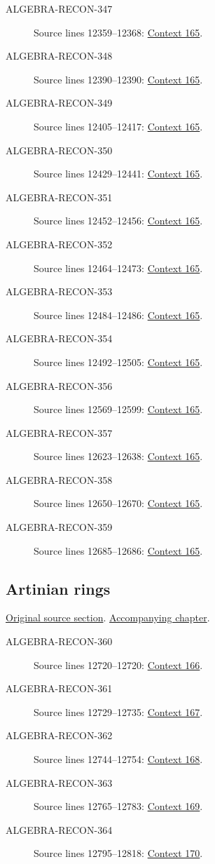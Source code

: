 \begin{description}
\item[ALGEBRA-RECON-347] Source lines 12359--12368: \hyperlink{algebra-context-165}{Context 165}.
\item[ALGEBRA-RECON-348] Source lines 12390--12390: \hyperlink{algebra-context-165}{Context 165}.
\item[ALGEBRA-RECON-349] Source lines 12405--12417: \hyperlink{algebra-context-165}{Context 165}.
\item[ALGEBRA-RECON-350] Source lines 12429--12441: \hyperlink{algebra-context-165}{Context 165}.
\item[ALGEBRA-RECON-351] Source lines 12452--12456: \hyperlink{algebra-context-165}{Context 165}.
\item[ALGEBRA-RECON-352] Source lines 12464--12473: \hyperlink{algebra-context-165}{Context 165}.
\item[ALGEBRA-RECON-353] Source lines 12484--12486: \hyperlink{algebra-context-165}{Context 165}.
\item[ALGEBRA-RECON-354] Source lines 12492--12505: \hyperlink{algebra-context-165}{Context 165}.
\item[ALGEBRA-RECON-356] Source lines 12569--12599: \hyperlink{algebra-context-165}{Context 165}.
\item[ALGEBRA-RECON-357] Source lines 12623--12638: \hyperlink{algebra-context-165}{Context 165}.
\item[ALGEBRA-RECON-358] Source lines 12650--12670: \hyperlink{algebra-context-165}{Context 165}.
\item[ALGEBRA-RECON-359] Source lines 12685--12686: \hyperlink{algebra-context-165}{Context 165}.
\end{description}

\subsection{Artinian rings}
\hypertarget{algebra-source-section-artinian}{}
\noindent\href{https://github.com/stacks/stacks-project/blob/a04446e57ec1fbc252a871afcec7752fb2807b14/algebra.tex\#L12699}{Original source section}. \href{algebra.pdf\#nameddest=section-artinian}{Accompanying chapter}.

\begin{description}
\item[ALGEBRA-RECON-360] Source lines 12720--12720: \hyperlink{algebra-context-166}{Context 166}.
\item[ALGEBRA-RECON-361] Source lines 12729--12735: \hyperlink{algebra-context-167}{Context 167}.
\item[ALGEBRA-RECON-362] Source lines 12744--12754: \hyperlink{algebra-context-168}{Context 168}.
\item[ALGEBRA-RECON-363] Source lines 12765--12783: \hyperlink{algebra-context-169}{Context 169}.
\item[ALGEBRA-RECON-364] Source lines 12795--12818: \hyperlink{algebra-context-170}{Context 170}.
\end{description}

